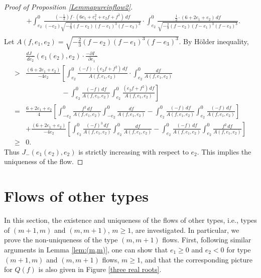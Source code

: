 \documentclass[reqno,12pt]{amsart}
\begin{document}
\begin{proof}[Proof of Proposition \ref{Lemmapureinflow2}]
\begin{align*}
   &+  \int_{e_2}^0  \frac{(-\frac12) f \cdot  (6e_1 + e_1^2 + e_2f + f^2)\, df }{(-e_2)\sqrt{-\frac23(f-e_2) (f-e_1)^3 (f-e_3)^3}} \cdot \int_{e_2}^0 \frac{\frac12 \cdot  (6+2e_1 +e_2)\, df }{\sqrt{-\frac23(f-e_2) (f-e_1)^3 (f-e_3)^3}}. \\
 \end{align*}
 Let $ A(f, e_1, e_2) = \sqrt{-\frac23(f-e_2) (f-e_1)^3 (f-e_3)^3} $. By H\"older inequality, 
 \begin{align*}  
& \frac{d J_{-}  }{d e_2} (e_1(e_2), e_2) \cdot \frac{-\partial I_{-}}{\partial e_1} \\
 > & \frac{(6+2e_1 +e_2)}{-4e_2} \left[ 
    \int_{e_2}^0 \frac{(-f)\cdot (e_2 f +f^2) \, df }{A(f, e_1, e_2)} \cdot \int_{e_2}^{0} \frac{df}{A(f, e_1, e_2)} \right. \\
    & \ \ \ \ \ \ \ \ \ \ \ \ \ \ \ \ \ \ \ \ \ \ \ - \left. \int_{e_2}^0 \frac{(-f) \, df}{A(f, e_1, e_2)} \int_{e_2}^0 \frac{(e_2 f + f^2) \, df}{A(f, e_1, e_2)} 
    \right] \\
    =  &  \frac{6+2e_1 +e_2}{4} \left[ \int_{-e_2}^0 \frac{f^2 \, df}{A(f, e_1, e_2)} \int_{-e_2}^0 \frac{df}{A(f, e_1, e_2)} - \int_{e_2}^0 \frac{(-f)\, df}{A(f, e_1, e_2)} \int_{e_2}^0 \frac{(-f) \, df}{A(f, e_1, e_2)}    \right]\\
    &+ \frac{(6+2e_1 +e_2)}{-4e_2}\left[ \int_{e_2}^0 \frac{(-f)^3 \, df}{A(f, e_1, e_2)}\int_{e_2}^0 \frac{df}{A(f, e_1, e_2)}   - \int_{e_2}^0 \frac{(-f)\, df}{A(f, e_1, e_2)} \int_{e_2}^0 \frac{f^2 \, df}{A(f, e_1, e_2)} \right] 
    \\
    \geq& 0
    . 
 \end{align*}
Thus $J_{-}(e_1(e_2), e_2)$ is strictly increasing with respect to $e_2$. This implies the uniqueness of the flow.
    

\end{proof}



\section{Flows of other types}\label{sec:Flows of other types}
In this section, the existence and uniqueness of the flows of other types, i.e., types of $(m+1, m)$ and $(m, m+1)$, $m\geq 1$, are investigated.  In particular, we prove the non-uniqueness of the type $(m, m+1)$ flows. 
First, following similar arguments in Lemma \ref{lem:(m,m)}, one can show that $e_1 \geq 0$ and $e_2 < 0$ for type $(m+1, m)$ and $(m, m+1)$ flows, $m\geq 1$, and that the corresponding picture for $Q(f)$ is also given in  Figure \ref{three real roots}.
\end{document}
